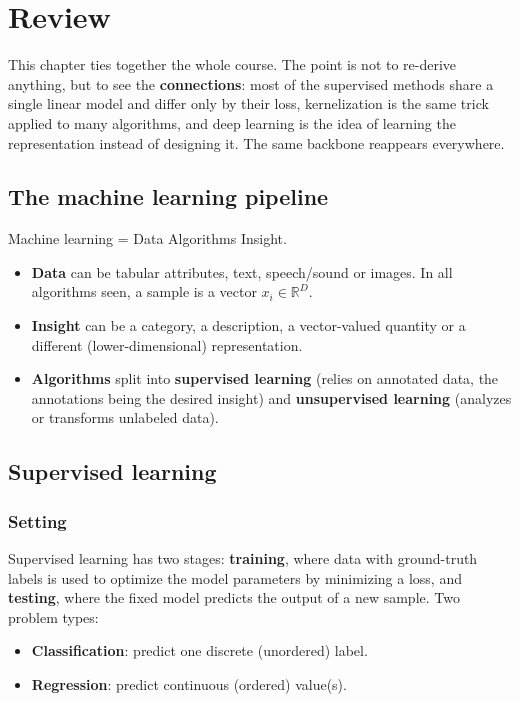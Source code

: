

\chapter{Review}
This chapter ties together the whole course. The point is not to re-derive
anything, but to see the \textbf{connections}: most of the supervised methods
share a single linear model and differ only by their loss, kernelization is the
same trick applied to many algorithms, and deep learning is the idea of learning
the representation instead of designing it. The same backbone reappears
everywhere.

\section{The machine learning pipeline}
Machine learning = Data \textrightarrow{} Algorithms \textrightarrow{} Insight.
\begin{itemize}
  \item \textbf{Data} can be tabular attributes, text, speech/sound or images.
  In all algorithms seen, a sample is a vector $x_i \in \mathbb{R}^D$.
  \item \textbf{Insight} can be a category, a description, a vector-valued
  quantity or a different (lower-dimensional) representation.
  \item \textbf{Algorithms} split into \textbf{supervised learning} (relies on
  annotated data, the annotations being the desired insight) and
  \textbf{unsupervised learning} (analyzes or transforms unlabeled data).
\end{itemize}

\section{Supervised learning}
\subsection{Setting}
Supervised learning has two stages: \textbf{training}, where data with
ground-truth labels is used to optimize the model parameters by minimizing a
loss, and \textbf{testing}, where the fixed model predicts the output of a new
sample. Two problem types:
\begin{itemize}
  \item \textbf{Classification}: predict one discrete (unordered) label.
  \item \textbf{Regression}: predict continuous (ordered) value(s).
\end{itemize}

